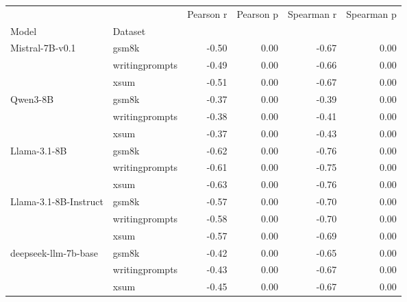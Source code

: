 \begin{tabular}{llrrrr}
\toprule
 &  & Pearson r & Pearson p & Spearman r & Spearman p \\
Model & Dataset &  &  &  &  \\
\midrule
\multirow[t]{3}{*}{Mistral-7B-v0.1} & gsm8k & -0.50 & 0.00 & -0.67 & 0.00 \\
 & writingprompts & -0.49 & 0.00 & -0.66 & 0.00 \\
 & xsum & -0.51 & 0.00 & -0.67 & 0.00 \\
\cline{1-6}
\multirow[t]{3}{*}{Qwen3-8B} & gsm8k & -0.37 & 0.00 & -0.39 & 0.00 \\
 & writingprompts & -0.38 & 0.00 & -0.41 & 0.00 \\
 & xsum & -0.37 & 0.00 & -0.43 & 0.00 \\
\cline{1-6}
\multirow[t]{3}{*}{Llama-3.1-8B} & gsm8k & -0.62 & 0.00 & -0.76 & 0.00 \\
 & writingprompts & -0.61 & 0.00 & -0.75 & 0.00 \\
 & xsum & -0.63 & 0.00 & -0.76 & 0.00 \\
\cline{1-6}
\multirow[t]{3}{*}{Llama-3.1-8B-Instruct} & gsm8k & -0.57 & 0.00 & -0.70 & 0.00 \\
 & writingprompts & -0.58 & 0.00 & -0.70 & 0.00 \\
 & xsum & -0.57 & 0.00 & -0.69 & 0.00 \\
\cline{1-6}
\multirow[t]{3}{*}{deepseek-llm-7b-base} & gsm8k & -0.42 & 0.00 & -0.65 & 0.00 \\
 & writingprompts & -0.43 & 0.00 & -0.67 & 0.00 \\
 & xsum & -0.45 & 0.00 & -0.67 & 0.00 \\
\cline{1-6}
\bottomrule
\end{tabular}
